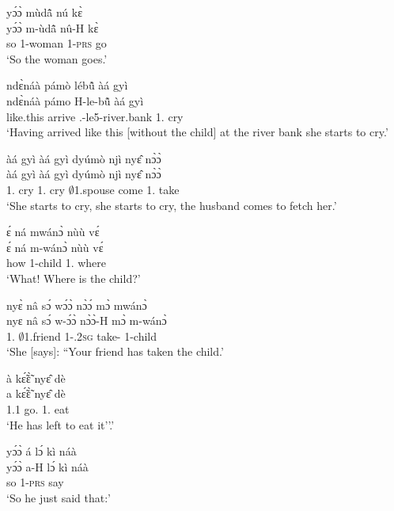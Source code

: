 \begin{exe}[(N234)]
\exN\label{n90}
  \glll yɔ́ɔ̀ mùdã̂ nú kɛ̀ \\
        yɔ́ɔ̀ m-ùdã̂ nû-H kɛ̀ \\
      so {\N}1-woman 1-\textsc{prs} go \\
    \trans `So the woman goes.'
 
\exN\label{n91}
  \glll  ndɛ̀náà pámò lébũ̂ àá gyì \\
         ndɛ̀náà pámo H-le-bũ̂ àá gyì \\
        like.this arrive {\OBJ}.{\LINK}-le5-river.bank 1.{\INCH} cry \\
    \trans `Having arrived like this [without the child] at the river bank she starts to cry.'
 
\exN\label{n92}
  \glll àá gyì àá gyì dyúmò njì nyɛ̂ nɔ̀ɔ̀ \\
       àá gyì àá gyì dyúmò njì nyɛ̂ nɔ̀ɔ̀ \\
       1.{\INCH} cry 1.{\INCH} cry $\emptyset$1.spouse come 1.{\OBJ} take  \\
    \trans `She starts to cry, she starts to cry, the husband comes to fetch her.'
 
\exN\label{n93}
  \glll ɛ́ ná mwánɔ̀ nùù vɛ́ \\
       ɛ́ ná m-wánɔ̀ nùù vɛ́ \\
       {\LOC} how {\N}1-child 1.{\COP} where  \\
    \trans `What! Where is the child?'
 
\exN\label{n94}
  \glll nyɛ̀ nâ sɔ́ wɔ́ɔ̀ nɔ̀ɔ́ mɔ̀ mwánɔ̀ \\
        nyɛ nâ sɔ́ w-ɔ́ɔ̀ nɔ̀ɔ̀-H mɔ̀ m-wánɔ̀ \\
      1.{\SBJ}  {\COMP} $\emptyset$1.friend 1-{\POSS}.2\textsc{sg} take-{\R} {\COMPL} 1-child   \\
    \trans `She [says]: ``Your friend has taken the child.'
 
\exN\label{n95} 
  \glll à kɛ̃́ɛ̃̀ nyɛ̂ dè \\
       a kɛ̃́ɛ̃̀ nyɛ̂ dè \\
       1.{\PST}1 go.{\COMPL} 1.{\OBJ} eat \\
    \trans `He has left to eat it''.'
 
\exN\label{n96}
  \glll yɔ́ɔ̀ á lɔ́ kì náà \\
        yɔ́ɔ̀ a-H lɔ́ kì náà \\
        so 1-\textsc{prs} {\RETRO}  say {\COMP} \\
    \trans `So he just said that:'
 

\end{exe}
